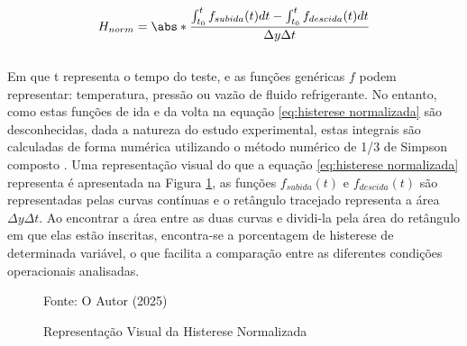 \begin{equation}
    H_{norm} = \abs*{{\frac{\int_{t_0} ^t  f_{subida}(t) dt - \int_{t_0} ^t  f_{descida}(t) dt   }{\Delta y\Delta t }}}
    \label{eq:histerese normalizada}
\end{equation}
\\
Em que t representa o tempo do teste, e as funções genéricas $f$ podem representar: temperatura, pressão ou vazão de fluido refrigerante. No entanto, como estas funções de ida e da volta na equação \ref{eq:histerese normalizada} são desconhecidas, dada a natureza do estudo experimental, estas integrais são calculadas de forma numérica utilizando o método numérico de 1/3 de Simpson composto \cite{ChapraNumerico}. Uma representação visual do que a equação \ref{eq:histerese normalizada} representa é apresentada na Figura \ref{fig:representação visual da histerese normalizada}, as funções $f_{subida}(t)$ e $f_{descida}(t)$ são representadas pelas curvas contínuas e o retângulo tracejado representa a área $\Delta y \Delta t$. Ao encontrar a área entre as duas curvas e dividi-la pela área do retângulo em que elas estão inscritas, encontra-se a porcentagem de histerese de determinada variável, o que facilita a comparação entre as diferentes condições operacionais analisadas.

\begin{figure}[h]
    \centering
    \caption{Representação Visual da Histerese Normalizada}
    \label{fig:representação visual da histerese normalizada}
    {\footnotesize Fonte: O Autor (2025)}
\end{figure}

